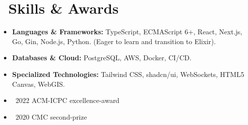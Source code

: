 \section{\faCogs\ Skills \& Awards}
\begin{itemize}[parsep=0.5ex]
  \item \textbf{Languages \& Frameworks:} TypeScript, ECMAScript 6+, React, Next.js, Go, Gin, Node.js, Python. (Eager to learn and transition to Elixir).
  \item \textbf{Databases \& Cloud:} PostgreSQL, AWS, Docker, CI/CD.
  \item \textbf{Specialized Technologies:} Tailwind CSS, shadcn/ui, WebSockets, HTML5 Canvas, WebGIS.
  \item {} \textbullet\ 2022 ACM-ICPC excellence-award
  \item {} \textbullet\ 2020 CMC second-prize
\end{itemize}